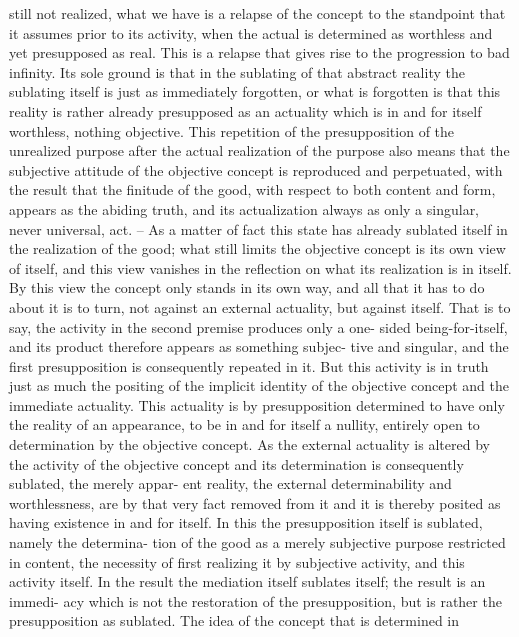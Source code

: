 still not realized, what we have is a relapse of the concept to the standpoint
that it assumes prior to its activity, when the actual is determined as
worthless and yet presupposed as real. This is a relapse that gives rise to the
progression to bad infinity. Its sole ground is that in the sublating of that
abstract reality the sublating itself is just as immediately forgotten, or what
is forgotten is that this reality is rather already presupposed as an actuality
which is in and for itself worthless, nothing objective. This repetition of
the presupposition of the unrealized purpose after the actual realization of
the purpose also means that the subjective attitude of the objective concept
is reproduced and perpetuated, with the result that the finitude of the good,
with respect to both content and form, appears as the abiding truth, and
its actualization always as only a singular, never universal, act. – As a matter
of fact this state has already sublated itself in the realization of the good;
what still limits the objective concept is its own view of itself, and this view
vanishes in the reflection on what its realization is in itself. By this view the
concept only stands in its own way, and all that it has to do about it is to
turn, not against an external actuality, but against itself.
That is to say, the activity in the second premise produces only a one-
sided being-for-itself, and its product therefore appears as something subjec-
tive and singular, and the first presupposition is consequently repeated in it.
But this activity is in truth just as much the positing of the implicit identity
of the objective concept and the immediate actuality. This actuality is by
presupposition determined to have only the reality of an appearance, to be
in and for itself a nullity, entirely open to determination by the objective
concept. As the external actuality is altered by the activity of the objective
concept and its determination is consequently sublated, the merely appar-
ent reality, the external determinability and worthlessness, are by that very
fact removed from it and it is thereby posited as having existence in and for
itself. In this the presupposition itself is sublated, namely the determina-
tion of the good as a merely subjective purpose restricted in content, the
necessity of first realizing it by subjective activity, and this activity itself.
In the result the mediation itself sublates itself; the result is an immedi-
acy which is not the restoration of the presupposition, but is rather the
presupposition as sublated. The idea of the concept that is determined in
